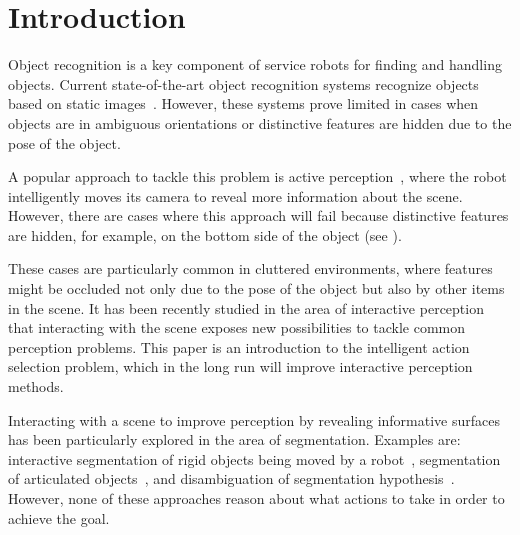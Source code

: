 
\section{Introduction}
    \vspace{-0.5ex}


Object recognition is a key component of service robots for finding and handling objects.
Current state-of-the-art object recognition systems recognize objects based on static images~\cite{tang2012textured,van2013fusing}.
However, these systems prove limited in cases when objects are in ambiguous orientations or distinctive features are hidden due to the pose of the object.
 

A popular approach to tackle this problem is active perception~\cite{atanasov2013hypothesis,hollinger2011active}, where the robot intelligently moves its camera to reveal more information about the scene.
However, there are cases where this approach will fail because distinctive features are hidden, for example, on the bottom side of the object (see ).


These cases are particularly common in cluttered environments, where features might be occluded not only due to the pose of the object but also by other items in the scene. 
It has been recently studied in the area of interactive perception that interacting with the scene exposes new possibilities to tackle common perception problems. This paper is an introduction to the intelligent action selection problem, which in the long run will improve interactive perception methods.


Interacting with a scene to improve perception by revealing informative surfaces has been particularly explored in the area of segmentation.
Examples are: interactive segmentation of rigid objects being moved by a robot~\cite{KenneyInteractive}, segmentation of articulated objects~\cite{Katz-WS-MM-ICRA2011}, and disambiguation of segmentation hypothesis~\cite{bergstrom11icvs}.
However, none of these approaches reason about what actions to take in order to achieve the goal.

